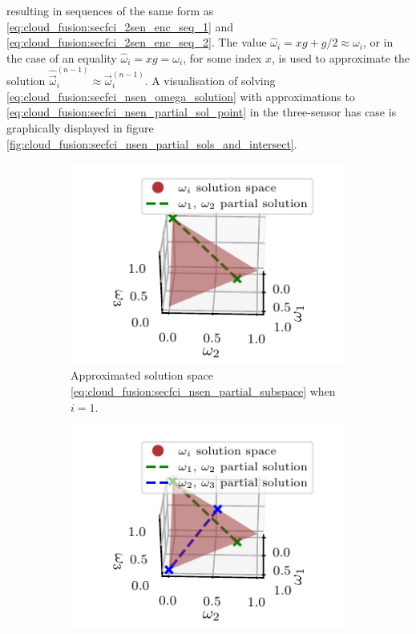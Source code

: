 resulting in sequences of the same form as \eqref{eq:cloud_fusion:secfci_2sen_enc_seq_1} and \eqref{eq:cloud_fusion:secfci_2sen_enc_seq_2}. The value $\hat{\omega}_i = xg + g/2 \approx \omega_i$, or in the case of an equality $\hat{\omega}_i = xg = \omega_i$, for some index $x$, is used to approximate the solution $\hat{\vec{\omega}}_i^{(n-1)} \approx \vec{\omega}_i^{(n-1)}$. A visualisation of solving \eqref{eq:cloud_fusion:secfci_nsen_omega_solution} with approximations to \eqref{eq:cloud_fusion:secfci_nsen_partial_sol_point} in the three-sensor has case is graphically displayed in figure \ref{fig:cloud_fusion:secfci_nsen_partial_sols_and_intersect}.
\begin{figure}[htbp]
    \begin{subfigure}[htbp]{\textwidth}
        \begin{center}
            \includegraphics{figures/partial_sol1.pdf}
        \end{center}
        \caption{Approximated solution space \eqref{eq:cloud_fusion:secfci_nsen_partial_subspace} when $i=1$.}
        \label{fig:3_sensor_partial_sol}
    \end{subfigure}
    \hfill
    \begin{subfigure}[htbp]{\textwidth}
        \begin{center}
            \includegraphics{figures/partial_sols.pdf}

\end{center}
\end{subfigure}
\end{figure}
